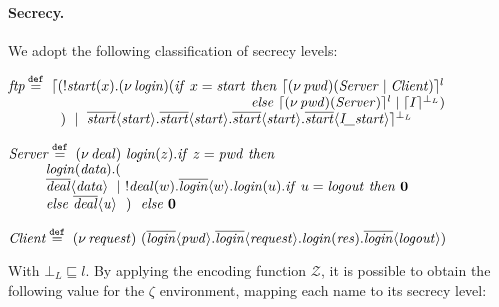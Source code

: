 \documentclass[10pt,a4paper,final,oneside,fleqn]{book}
\newcommand*{\eqdef}{\mathbin{\mathop{=}\limits^{\texttt{def}}}}
\begin{document}
\paragraph{Secrecy.} We adopt the following classification of secrecy levels:

\noindent
$\mbox{{\itshape ftp\/}}\eqdef~\lceil(!\mbox{{\itshape start\/}}(x).(\nu~\!\mbox{{\itshape login\/}})(\mbox{{\itshape if\/} }x=\mbox{{\itshape start\/}}\mbox{ {\itshape then\/} }\lceil(\nu~\!\mbox{{\itshape pwd\/}})(\mbox{{\itshape Server\/}}\mid\mbox{{\itshape Client\/}})\rceil^l$\\
$~~~~~~~~~~~~~~~~~~~~~~~~~~~~~~~~~~~~~~~~~~~~~~~~~~~\mbox{ {\itshape else\/} }\lceil(\nu~\!\mbox{{\itshape pwd\/}})(\mbox{{\itshape Server\/}})\rceil^l\mid\lceil I\rceil^{\bot_L})$\\
$~~~~~~~~~~~)~\mid~\overline{\mbox{{\itshape start\/}}}\langle\mbox{{\itshape start\/}}\rangle.\overline{\mbox{{\itshape start\/}}}\langle\mbox{{\itshape start\/}}\rangle.\overline{\mbox{{\itshape start\/}}}\langle\mbox{{\itshape start\/}}\rangle.\overline{\mbox{{\itshape start\/}}}\langle\mbox{{\itshape I\_start\/}}\rangle\rceil^{\bot_L}$

\noindent
$\mbox{{\itshape Server\/}}\eqdef~(\nu~\!\mbox{{\itshape deal\/}})~\mbox{{\itshape login\/}}(z).\mbox{{\itshape if\/} }z=\mbox{{\itshape pwd\/} }\mbox{{\itshape then\/}}$\\
$~~~~~~~~\mbox{{\itshape login\/}}(\mbox{{\itshape data}}).($\\
$~~~~~~~~\overline{\mbox{{\itshape deal\/}}}\langle\mbox{{\itshape data\/}}\rangle~\mid~!\mbox{{\itshape deal\/}}(w).\overline{\mbox{{\itshape login\/}}}\langle w\rangle.\mbox{{\itshape login\/}}(u).\mbox{{\itshape if\/} }u=\mbox{{\itshape logout\/} }\mbox{{\itshape then\/} }{\bf 0}$\\
$~~~~~~~~\mbox{{\itshape else\/} }\overline{\mbox{{\itshape deal\/}}}\langle\mbox{{\itshape u\/}}\rangle~~)~~\mbox{{\itshape else\/} }{\bf 0}$\vspace{5mm}

\noindent
$\mbox{{\itshape Client\/}}\eqdef~(\nu~\!\mbox{{\itshape request\/}})~(\overline{\mbox{{\itshape login\/}}}\langle\mbox{{\itshape pwd\/}}\rangle.\overline{\mbox{{\itshape login\/}}}\langle\mbox{{\itshape request\/}}\rangle.\mbox{{\itshape login\/}}(\mbox{{\itshape res\/}}).\overline{\mbox{{\itshape login\/}}}\langle\mbox{{\itshape logout\/}}\rangle)$\vspace{6mm}

\noindent
With $\bot_L\sqsubseteq l$. By applying the encoding function $\mathcal{Z}$, it is possible to obtain the following value for the $\zeta$ environment, mapping each name to its secrecy level:\vspace{6mm}
\end{document}
